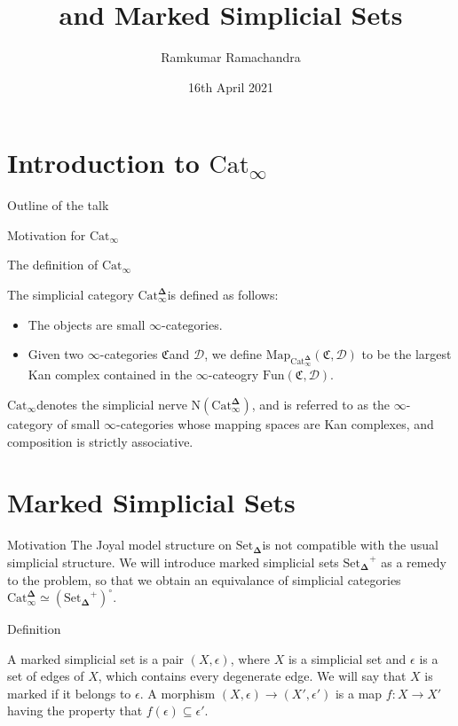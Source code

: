 \documentclass{beamer}[9pt]
\title{\texorpdfstring{\Catinf}{Cat∞} and Marked Simplicial Sets}
\author{Ramkumar Ramachandra}
\date{16th April 2021}
\institute{Université de Paris}
\newcommand{\8}{\ensuremath{\infty}}
\newcommand{\C}{\ensuremath{\mathfrak{C}}}
\newcommand{\D}{\ensuremath{\mathscr{D}}}
\newcommand{\SSet}{\ensuremath{\text{Set}_{\boldsymbol{\Delta}}}}
\newcommand{\Catinfdel}{\ensuremath{\text{Cat}^{\boldsymbol{\Delta}}_{\infty}}}
\newcommand{\Catinf}{\ensuremath{\text{Cat}_{\infty}}}
\newcommand{\Map}{\ensuremath{\text{Map}}}
\newcommand{\Fun}{\ensuremath{\text{Fun}}}
\begin{document}
\begin{frame}
  \titlepage
\end{frame}

\section{Introduction to \texorpdfstring{\Catinf}{Cat∞}}

\begin{frame}{Outline of the talk}
  \tableofcontents[sectionstyle=show/hide]
\end{frame}

\begin{frame}{Motivation for \texorpdfstring{\Catinf}{Cat∞}}
\end{frame}

\begin{frame}{The definition of \texorpdfstring{\Catinf}{Cat∞}}
  \begin{definition}[\texorpdfstring{\Catinf}{Cat∞}]
    The simplicial category \Catinfdel is defined as follows:
    \begin{itemize}
      \item The objects are small \8-categories.
      \item Given two \8-categories \C and \D, we define $\Map_{\Catinfdel}(\C, \D)$ to be the largest Kan complex contained in the \8-cateogry $\Fun(\C, \D)$.
    \end{itemize}
  \end{definition}

  \Catinf denotes the simplicial nerve $\text{N}(\Catinfdel)$, and is referred to as the \8-category of small \8-categories whose mapping spaces are Kan complexes, and composition is strictly associative.
\end{frame}

\section{Marked Simplicial Sets}

\begin{frame}{Motivation}
  The Joyal model structure on \SSet is not compatible with the usual simplicial structure. We will introduce marked simplicial sets $\SSet^+$ as a remedy to the problem, so that we obtain an equivalance of simplicial categories $\Catinfdel \simeq (\SSet^+)^\circ$.
\end{frame}


\begin{frame}{Definition}
  \begin{definition}
    A marked simplicial set is a pair $(X, \epsilon)$, where $X$ is a simplicial set and $\epsilon$ is a set of edges of $X$, which contains every degenerate edge. We will say that $X$ is marked if it belongs to $\epsilon$. A morphism $(X, \epsilon) \rightarrow (X', \epsilon')$ is a map $f : X \rightarrow X'$ having the property that $f(\epsilon) \subseteq \epsilon'$.
  \end{definition}
\end{frame}
\end{document}
